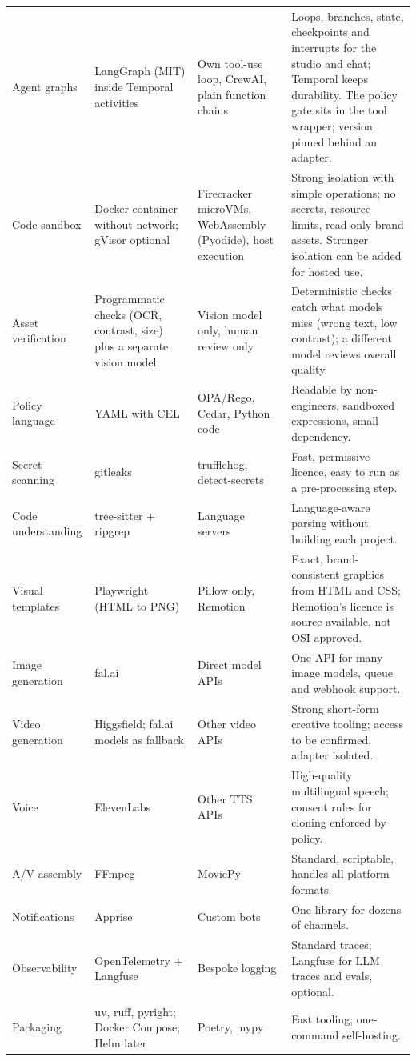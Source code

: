 \documentclass[11pt,a4paper]{article}
\begin{document}
{\begin{longtable}{@{}>{\raggedright\arraybackslash}p{2.3cm}>{\raggedright\arraybackslash}p{3.5cm}>{\raggedright\arraybackslash}p{3.2cm}>{\raggedright\arraybackslash}p{6.3cm}@{}}
Agent graphs & LangGraph (MIT) inside Temporal activities & Own tool-use loop, CrewAI, plain function chains & Loops, branches, state, checkpoints and interrupts for the studio and chat; Temporal keeps durability. The policy gate sits in the tool wrapper; version pinned behind an adapter.\\
Code sandbox & Docker container without network; gVisor optional & Firecracker microVMs, WebAssembly (Pyodide), host execution & Strong isolation with simple operations; no secrets, resource limits, read-only brand assets. Stronger isolation can be added for hosted use.\\
Asset verification & Programmatic checks (OCR, contrast, size) plus a separate vision model & Vision model only, human review only & Deterministic checks catch what models miss (wrong text, low contrast); a different model reviews overall quality.\\
Policy language & YAML with CEL & OPA/Rego, Cedar, Python code & Readable by non-engineers, sandboxed expressions, small dependency.\\
Secret scanning & gitleaks & trufflehog, detect-secrets & Fast, permissive licence, easy to run as a pre-processing step.\\
Code understanding & tree-sitter + ripgrep & Language servers & Language-aware parsing without building each project.\\
Visual templates & Playwright (HTML to PNG) & Pillow only, Remotion & Exact, brand-consistent graphics from HTML and CSS; Remotion's licence is source-available, not OSI-approved.\\
Image generation & fal.ai & Direct model APIs & One API for many image models, queue and webhook support.\\
Video generation & Higgsfield; fal.ai models as fallback & Other video APIs & Strong short-form creative tooling; access to be confirmed, adapter isolated.\\
Voice & ElevenLabs & Other TTS APIs & High-quality multilingual speech; consent rules for cloning enforced by policy.\\
A/V assembly & FFmpeg & MoviePy & Standard, scriptable, handles all platform formats.\\
Notifications & Apprise & Custom bots & One library for dozens of channels.\\
Observability & OpenTelemetry + Langfuse & Bespoke logging & Standard traces; Langfuse for LLM traces and evals, optional.\\
Packaging & uv, ruff, pyright; Docker Compose; Helm later & Poetry, mypy & Fast tooling; one-command self-hosting.\\

\end{longtable}}
\end{document}
